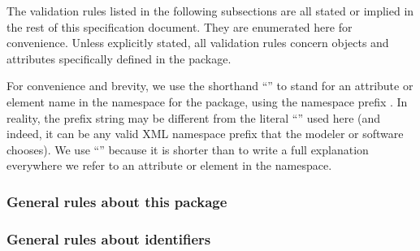 The validation rules listed in the following subsections are all stated
or implied in the rest of this specification document. They are
enumerated here for convenience. Unless explicitly stated, all
validation rules concern objects and attributes specifically defined in
the \SpatialProcessesPackage package.

For \notice convenience and brevity, we use the shorthand
``'' to stand for an attribute or element name
 in the namespace for the \SpatialProcessesPackage package,
using the namespace prefix . In reality, the prefix
string may be different from the literal ``'' used here
(and indeed, it can be any valid XML namespace prefix that the modeler
or software chooses). We use ``'' because it is
shorter than to write a full explanation everywhere we refer to an
attribute or element in the \SpatialProcessesPackage namespace.



\subsubsection*{General rules about this package}



\subsubsection*{General rules about identifiers}

